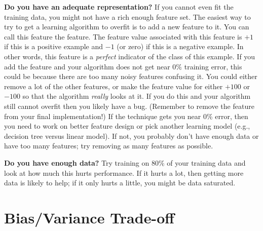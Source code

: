 \textbf{Do you have an adequate representation?} 
If you cannot even fit the training data, you might not have a rich enough feature set.
The easiest way to try to get a learning algorithm to overfit is to
add a new feature to it.  You can call this feature the
 feature.  The feature value
associated with this feature is $+1$ if this is a positive example and
$-1$ (or zero) if this is a negative example.  In other words, this
feature is a \emph{perfect} indicator of the class of this example.
If you add the  feature and your algorithm does
not get near $0\%$ training error, this could be because there are too
many noisy features confusing it.  You could either remove a lot of
the other features, or make the feature value for 
either $+100$ or $-100$ so that the algorithm \emph{really} looks at
it.  If you do this and your algorithm still cannot overfit then you
likely have a bug.  (Remember to remove the 
feature from your final implementation!)
If the  technique gets you near 0\% error, then you need to work on better feature design or pick another learning model (e.g., decision tree versus linear model). If not, you probably don't have enough data or have too many features; try removing as many features as possible.

\textbf{Do you have enough data?} Try training on 80\% of your training data and look at how much this hurts performance. If it hurts a lot, then getting more data is likely to help; if it only hurts a little, you might be data saturated.



\section{Bias/Variance Trade-off}

